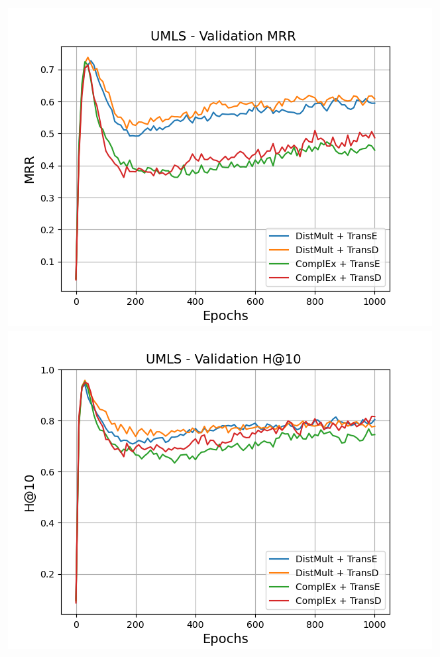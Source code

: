 \begin{figure}
    \centering
    \begin{minipage}{.5\textwidth}
      \centering
      \includegraphics[width=\linewidth]{figures/results/gan_train/not_pretrained/random/umls/epochs1000/random_umls_mrrs.png}
    \end{minipage}%
    \begin{minipage}{.5\textwidth}
      \centering
      \includegraphics[width=\linewidth]{figures/results/gan_train/not_pretrained/random/umls/epochs1000/random_umls_hit10.png}
    \end{minipage}
    

\end{figure}
